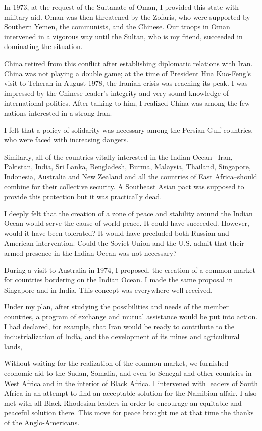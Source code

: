 In 1973, at the request of the Sultanate of Oman, I provided this state with military aid. Oman was then threatened by the Zofaris, who were supported by Southern Yemen, the communists, and the Chinese. Our troops in Oman intervened in a vigorous way until the Sultan, who is my friend, succeeded in dominating the situation. 

China retired from this conflict after establishing diplomatic relations with Iran. China was not playing a double game; at the time of President Hua Kuo-Feng’s visit to Teheran in August 1978, the Iranian crisis was reaching its peak. I was impressed by the Chinese leader's integrity and very sound knowledge of international politics. After talking to him, I realized China was among the few nations interested in a strong Iran. 

I felt that a policy of solidarity was necessary among the Persian Gulf countries, who were faced with increasing dangers. 


Similarly, all of the countries vitally interested in the Indian Ocean-- Iran, Pakistan, India, Sri Lanka, Bengladesh, Burma, Malaysia, Thailand, Singapore, Indonesia, Australia and New Zealand and all the countries of East Africa--should combine for their collective security. A Southeast Asian pact was supposed to provide this protection but it was practically dead. 

I deeply felt that the creation of a zone of peace and stability around the Indian Ocean would serve the cause of world peace. It could have succeeded. However, would it have been tolerated? It would have precluded both Russian and American intervention. Could the Soviet Union and the U.S. admit that their armed presence in the Indian Ocean was not necessary? 

During a visit to Australia in 1974, I proposed, the creation of a common market for countries bordering on the Indian Ocean. I made the same proposal in Singapore and in India. This concept was everywhere well received. 

Under my plan, after studying the possibilities and needs of the member countries, a program of exchange and mutual assistance would be put into action. I had declared, for example, that Iran would be ready to contribute to the industrialization of India, and the development of its mines and agricultural lands, 

Without waiting for the realization of the common market, we furnished economic aid to the Sudan, Somalia, and even to Senegal and other countries in West Africa and in the interior of Black Africa. I intervened with leaders of South Africa in an attempt to find an acceptable solution for the Namibian affair. I also met with all Black Rhodesian leaders in order to encourage an equitable and peaceful solution there. This move for peace brought me at that time the thanks of the Anglo-Americans. 

